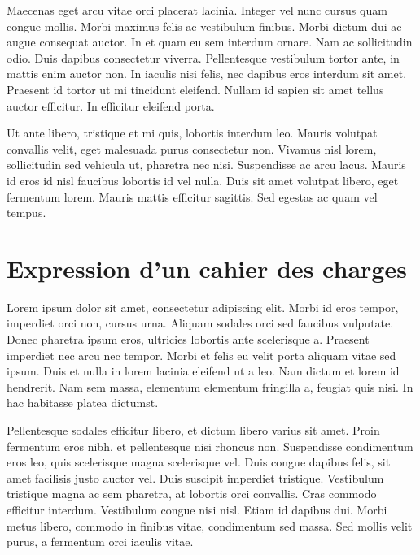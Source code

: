 \documentclass{report}
\begin{document}
Maecenas eget arcu vitae orci placerat lacinia. Integer vel nunc cursus quam congue mollis. Morbi maximus felis ac vestibulum finibus. Morbi dictum dui ac augue consequat auctor. In et quam eu sem interdum ornare. Nam ac sollicitudin odio. Duis dapibus consectetur viverra. Pellentesque vestibulum tortor ante, in mattis enim auctor non. In iaculis nisi felis, nec dapibus eros interdum sit amet. Praesent id tortor ut mi tincidunt eleifend. Nullam id sapien sit amet tellus auctor efficitur. In efficitur eleifend porta.

Ut ante libero, tristique et mi quis, lobortis interdum leo. Mauris volutpat convallis velit, eget malesuada purus consectetur non. Vivamus nisl lorem, sollicitudin sed vehicula ut, pharetra nec nisi. Suspendisse ac arcu lacus. Mauris id eros id nisl faucibus lobortis id vel nulla. Duis sit amet volutpat libero, eget fermentum lorem. Mauris mattis efficitur sagittis. Sed egestas ac quam vel tempus.

\section{Expression d'un cahier des charges}
Lorem ipsum dolor sit amet, consectetur adipiscing elit. Morbi id eros tempor, imperdiet orci non, cursus urna. Aliquam sodales orci sed faucibus vulputate. Donec pharetra ipsum eros, ultricies lobortis ante scelerisque a. Praesent imperdiet nec arcu nec tempor. Morbi et felis eu velit porta aliquam vitae sed ipsum. Duis et nulla in lorem lacinia eleifend ut a leo. Nam dictum et lorem id hendrerit. Nam sem massa, elementum elementum fringilla a, feugiat quis nisi. In hac habitasse platea dictumst.

Pellentesque sodales efficitur libero, et dictum libero varius sit amet. Proin fermentum eros nibh, et pellentesque nisi rhoncus non. Suspendisse condimentum eros leo, quis scelerisque magna scelerisque vel. Duis congue dapibus felis, sit amet facilisis justo auctor vel. Duis suscipit imperdiet tristique. Vestibulum tristique magna ac sem pharetra, at lobortis orci convallis. Cras commodo efficitur interdum. Vestibulum congue nisi nisl. Etiam id dapibus dui. Morbi metus libero, commodo in finibus vitae, condimentum sed massa. Sed mollis velit purus, a fermentum orci iaculis vitae.
\end{document}

